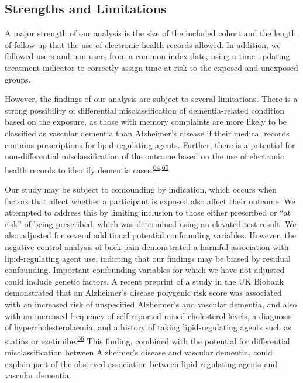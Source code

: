 \documentclass[a4paper, twoside]{templates/ociamthesis}
\begin{document}
\hypertarget{strengths-and-limitations}{%
\subsection{Strengths and Limitations}\label{strengths-and-limitations}}

A major strength of our analysis is the size of the included cohort and the length of follow-up that the use of electronic health records allowed. In addition, we followed users and non-users from a common index date, using a time-updating treatment indicator to correctly assign time-at-risk to the exposed and unexposed groups.

However, the findings of our analysis are subject to several limitations. There is a strong possibility of differential misclassification of dementia-related condition based on the exposure, as those with memory complaints are more likely to be classified as vascular dementia than Alzheimer's disease if their medical records contains prescriptions for lipid-regulating agents. Further, there is a potential for non-differential misclassification of the outcome based on the use of electronic health records to identify dementia cases.\textsuperscript{\protect\hyperlink{ref-wilkinson2018}{64},\protect\hyperlink{ref-mcguinness2019b}{65}}

Our study may be subject to confounding by indication, which occurs when factors that affect whether a participant is exposed also affect their outcome. We attempted to address this by limiting inclusion to those either prescribed or ``at risk'' of being prescribed, which was determined using an elevated test result. We also adjusted for several additional potential confounding variables. However, the negative control analysis of back pain demonstrated a harmful association with lipid-regulating agent use, indicting that our findings may be biased by residual confounding. Important confounding variables for which we have not adjusted could include genetic factors. A recent preprint of a study in the UK Biobank demonstrated that an Alzheimer's disease polygenic risk score was associated with an increased risk of unspecified Alzheimer's and vascular dementia, and also with an increased frequency of self-reported raised cholesterol levels, a diagnosis of hypercholesterolaemia, and a history of taking lipid-regulating agents such as statins or ezetimibe.\textsuperscript{\protect\hyperlink{ref-korologou-linden2020}{66}} This finding, combined with the potential for differential misclassification between Alzheimer's disease and vascular dementia, could explain part of the observed association between lipid-regulating agents and vascular dementia.
\end{document}
